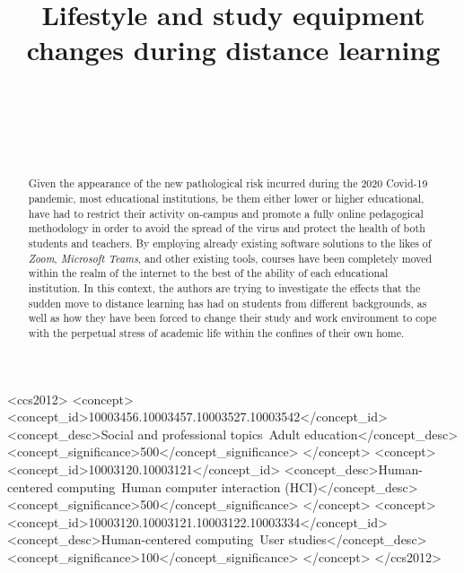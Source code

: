 \documentclass{sigchi}
\def\plaintitle{Lifestyle and study equipment changes during distance learning}
\begin{document}
\title{\plaintitle}

\author{%
  \\
  \\
  \\
  \\
}

\maketitle

\begin{abstract}
Given the appearance of the new pathological risk incurred during the 2020 Covid-19 pandemic, most educational institutions, be them either lower or higher educational, have had to restrict their activity on-campus and promote a fully online pedagogical methodology in order to avoid the spread of the virus and protect the health of both students and teachers. By employing already existing software solutions to the likes of \emph{Zoom}, \emph{Microsoft Teams}, and other existing tools, courses have been completely moved within the realm of the internet to the best of the ability of each educational institution. In this context, the authors are trying to investigate the effects that the sudden move to distance learning has had on students from different backgrounds, as well as how they have been forced to change their study and work environment to cope with the perpetual stress of academic life within the confines of their own home.
\end{abstract}



\begin{CCSXML}
<ccs2012>
<concept>
<concept_id>10003456.10003457.10003527.10003542</concept_id>
<concept_desc>Social and professional topics~Adult education</concept_desc>
<concept_significance>500</concept_significance>
</concept>
<concept>
<concept_id>10003120.10003121</concept_id>
<concept_desc>Human-centered computing~Human computer interaction (HCI)</concept_desc>
<concept_significance>500</concept_significance>
</concept>
<concept>
<concept_id>10003120.10003121.10003122.10003334</concept_id>
<concept_desc>Human-centered computing~User studies</concept_desc>
<concept_significance>100</concept_significance>
</concept>
</ccs2012>
\end{CCSXML}
\end{document}
